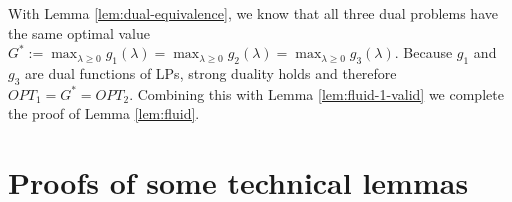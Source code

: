 \documentclass[opre]{informs3aa}
\renewcommand{\tilde}{\widetilde}
\renewcommand{\tilde}{\widetilde}
\begin{document}
\begin{appendices}
{With Lemma \ref{lem:dual-equivalence}, we know that all three dual problems have the same optimal value $G^* := \max_{\lambda\geq 0}g_1(\lambda) = \max_{\lambda\geq 0}g_2(\lambda) = \max_{\lambda\geq 0}g_3(\lambda)$.
Because $g_1$ and $g_3$ are dual functions of LPs, strong duality holds and therefore $OPT_1=G^*=OPT_2$. 
Combining this with Lemma \ref{lem:fluid-1-valid} we complete the proof of Lemma \ref{lem:fluid}.

\vspace{.2cm}
}


\section{Proofs of some technical lemmas}
\label{app:proof}

\vspace{.2cm}
%
%


\end{appendices}
\end{document}
